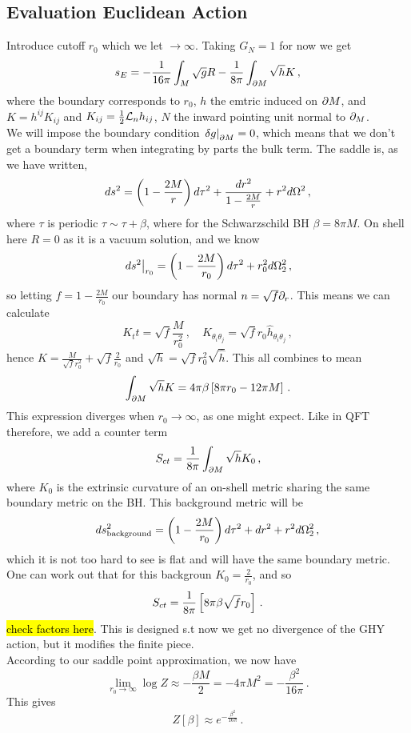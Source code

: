 \documentclass{article}
\begin{document}
\subsection{Evaluation Euclidean Action} 
Introduce cutoff $r_0$ which we let $ \to \infty$. Taking $G_N = 1$ for now we get 
\[
s_E = -\frac{1}{16 \pi } \int_M \sqrt{g}R - \frac{1}{8 \pi} \int_{\partial M} \sqrt{h} K \, ,
\]
where the boundary corresponds to $r_0$, $h$ the emtric induced on $\partial M$, and $K = h^{ij} K_{ij}$ and $K_{ij} = \frac{1}{2}\mathcal{L}_n h_{ij}$, $N$ the inward pointing unit normal to $\partial_M$. \\
We will impose the boundary condition $\left. \delta g \right\rvert_{\partial M}=0$, which means that we don't get a boundary term when integrating by parts the bulk term. The saddle is, as we have written, 
\[
ds^2 = \left( 1-\frac{2M}{r} \right) d\tau^2 + \frac{dr^2}{1-\frac{2M}{r}} + r^2 d \Omega^2 \, ,
\]
where $\tau$ is periodic $\tau \sim \tau+\beta$, where for the Schwarzschild BH $\beta = 8 \pi M$. On shell here $R=0$ as it is a vacuum solution, and we know 
\[
\left. ds^2 \right\rvert_{r_0} = \left( 1-\frac{2M}{r_0} \right) d\tau^2 + r_0^2 d \Omega_2^2 \, ,
\]
so letting $f = 1-\frac{2M}{r_0}$ our boundary has normal $n = \sqrt{f}\partial_r$. This means we can calculate 
\[
K_tt = \sqrt{f} \frac{M}{r_0^2} \, , \quad K_{\theta_i \theta_j} = \sqrt{f} r_0 \hat{h}_{\theta_i \theta_j} \, ,
\]
hence $K = \frac{M}{\sqrt{f} r_0^2} + \sqrt{f} \frac{2}{r_0}$ and $\sqrt{h} = \sqrt{f} r_0^2 \sqrt{\hat{h}}$. This all combines to mean 
\[
\int_{\partial M} \sqrt{h} K = 4 \pi \beta \left[ 8 \pi r_0 - 12 \pi M \right] \, .
\] 
This expression diverges when $r_0 \to \infty$, as one might expect. Like in QFT therefore, we add a counter term 
\[
S_{ct} = \frac{1}{8 \pi } \int_{\partial M} \sqrt{h} K_0 \, ,
\]
where $K_0$ is the extrinsic curvature of an on-shell metric sharing the same boundary metric on the BH. This background metric will be 
\[
ds^2_{\text{background}} = \left( 1-\frac{2M}{r_0} \right) d\tau^2 + dr^2 + r^2 d\Omega_2^2 \, ,
\]
which it is not too hard to see is flat and will have the same boundary metric. One can work out that for this backgroun $K_0 = \frac{2}{r_0}$, and so 
\[
S_{ct} = \frac{1}{8 \pi} \left[ 8 \pi \beta \sqrt{f} r_0 \right] \, .
\]
\hl{check factors here}. This is designed s.t now we get no divergence of the GHY action, but it modifies the finite piece. \\
According to our saddle point approximation, we now have 
\[
\lim_{r_0 \to \infty} \log Z \approx -\frac{\beta M}{2} = - 4 \pi M^2 = -\frac{\beta^2}{16 \pi} \, .  
\]
This gives 
\[
Z[\beta] \approx e^{-\frac{\beta^2}{16 \pi}} \, . 
\]
\end{document}

